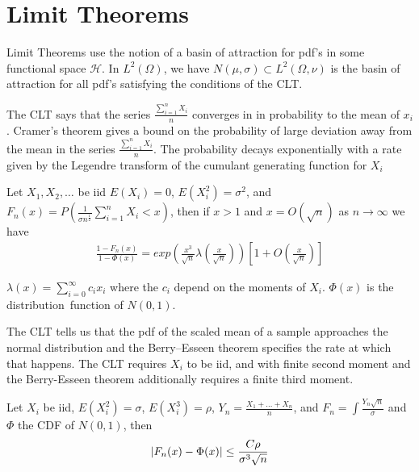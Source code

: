 \section{Limit Theorems}
Limit Theorems use the notion of a basin of attraction for pdf's in some functional space $\mathcal{H}$. In $L^2(\Omega)$, we have $N(\mu,\sigma) \subset L^2(\Omega, \nu)$ is the basin of attraction for all pdf's satisfying the conditions of the CLT.

The CLT says that the series $\frac{\sum\limits_{i=1}^{n} X_i}{n}$ converges in in probability to the mean of $x_i$. Cramer's theorem gives a bound on the probability of large deviation away from the mean in the series $\frac{\sum\limits_{i=1}^{n} X_i}{n}$.  The probability decays exponentially with a rate given by the Legendre transform of the cumulant generating function for $X_i$
\begin{thm}
Let $X_1, X_2, \hdots $ be iid $E(X_i)=0$, $E(X_i^2)= \sigma^2$, and $F_n(x) = P(\frac{1}{\sigma n^{\frac{1}{2}}}  \sum\limits_{i=1}^{n} X_i < x)$, then if $x>1$ and $x=O(\sqrt{n})$ as  $n \rightarrow \infty$
we have
\begin{eqnarray*}
  \frac{1-F_n(x)}{1-\Phi(x)} = exp ( \frac{x^3}{\sqrt{n}} \lambda( \frac{x}{\sqrt{n}} )  ) [ 1 + O(\frac{x}{\sqrt{n}}) ]
\end{eqnarray*}

$\lambda(x) = \sum\limits_{i=0}^{\infty} c_i x_i$   where the $c_i$ depend on the moments of $X_i$.
$\Phi(x)$ is the distribution\ function of $N(0,1)$.
\end{thm}

\begin{thm}
\end{thm}

The CLT tells us that the pdf of the scaled mean of a sample approaches the normal distribution and the Berry–Esseen theorem specifies the rate at which that happens.  The CLT requires $X_i$ to be iid, and with finite second moment and the Berry-Esseen theorem additionally requires a finite third moment.
\begin{thm}
Let ${X_i}$ be iid, $E(X_i^2)=\sigma$, $E(X_i^3)=\rho$, $Y_n = \frac{X_1 + \ldots + X_n}{n}$, and $F_n = \int \frac{Y_n \sqrt{n} }{\sigma}$ and $\Phi$ the CDF of $N(0,1)$, then
\begin{equation}
\left\vert F_n(x) - \Phi(x)\right\vert \leq \frac{C \rho}{ \sigma^3 \sqrt{n} }
\end{equation}

\end{thm}

